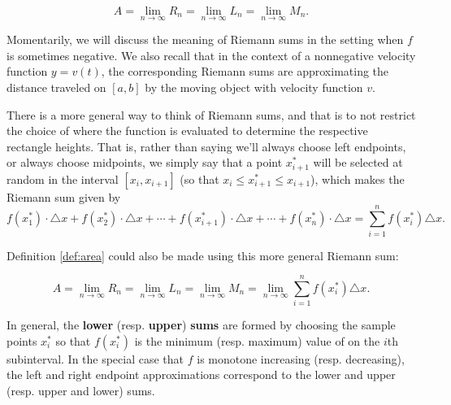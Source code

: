 $$A = \lim_{n \to \infty} R_n = \lim_{n \to \infty} L_n = \lim_{n \to \infty} M_n.$$  


Momentarily, we will discuss the meaning of Riemann sums in the setting when $f$ is sometimes negative.  We also recall that in the context of a nonnegative velocity function $y = v(t)$, the corresponding Riemann sums are approximating the distance traveled on $[a,b]$ by the moving object with velocity function $v$.

There is a more general way to think of Riemann sums, and that is to not restrict the choice of where the function is evaluated to determine the respective rectangle heights.  That is, rather than saying we'll always choose left endpoints, or always choose midpoints, we simply say that a point $x_{i+1}^*$ will be selected at random in the interval $[x_i, x_{i+1}]$ (so that $x_i \le x_{i+1}^* \le x_{i+1}$), which makes the Riemann sum given by 
$$f(x_1^*) \cdot \triangle x + f(x_2^*) \cdot \triangle x + \cdots + f(x_{i+1}^*) \cdot \triangle x + \cdots + f(x_n^*) \cdot \triangle x = \sum_{i=1}^{n} f(x_i^*) \triangle x.$$

Definition \ref{def:area} could also be made using this more general Riemann sum:

\begin{formulabox}
$$A = \lim_{n \to \infty} R_n = \lim_{n \to \infty} L_n = \lim_{n \to \infty} M_n = \lim_{n \to \infty} \sum_{i=1}^{n} f(x_i^*) \triangle x.$$  
\end{formulabox}

In general, the \textbf{lower} (resp. \textbf{upper}) \textbf{sums} are formed by choosing the sample points $ x_i^* $ so that $ f(x_i^*) $ is the minimum (resp. maximum) value of on the $ i $th subinterval. In the special case that $ f $ is monotone increasing  (resp. decreasing), the left and right endpoint approximations correspond to the lower and upper (resp. upper and lower) sums.
   

